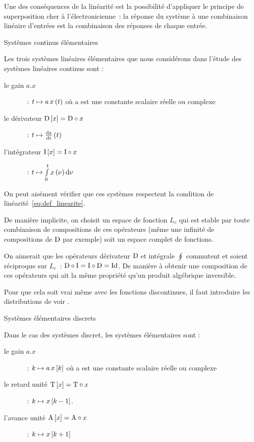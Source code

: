 Une des conséquences de la linéarité est la possibilité d'appliquer le
principe de superposition cher à l'électronicienne~: \og{} la réponse
du système à une combinaison linéaire d'entrées est la combinaison des
réponses de chaque entrée.\fg{}

\begin{definition}{Systèmes continus élémentaires}
  \label{def:systeme_elementaires_continus}
  
  Les trois systèmes linéaires élémentaires que nous considérons dans
  l'étude des systèmes linéaires continus sont :
  \begin{description}
  \item[le gain $a.x$]~: $t \mapsto a\,x\left(t\right)$ où a est une constante
    scalaire réelle ou complexe
  \item[le dérivateur $\mathrm{D}\left[x\right]=\mathrm{D}\circ x$]~:
    $ t \mapsto \frac{\mathrm{d{x}}}{\mathrm{d{t}}}\left(t\right) $
  \item[l'intégrateur $\mathrm{I}\left[x\right]=\mathrm{I}\circ x$]~:
    $ t \mapsto \int\limits_{0}^{t}{x\left(\nu\right)\mathrm{d{\nu}}}$
  \end{description}
\end{definition}

On peut aisément vérifier que ces systèmes respectent la condition de
linéarité~\ref{eq:def_linearite}.

\begin{remarque}
  De manière implicite, on choisit un espace de fonction $L_c$ qui est
  stable par toute combinaison de compositions de ces opérateurs (même
  une infinité de compositions de $\mathrm{D}$ par exemple) soit un espace
  complet de fonctions.

  On aimerait que les opérateurs dérivateur $\mathrm{D}$ et intégrale
  $\oint$ commutent et soient réciproque sur $L_c$~:
  $\mathrm{D}\circ\mathrm{I}=\mathrm{I}\circ\mathrm{D}=\mathrm{Id}$. De manière à obtenir une
  composition de ces opérateurs qui ait la même propriété qu'un
  produit algébrique inversible.
  
  Pour que cela soit vrai même avec les fonctions discontinues, il
  faut introduire les distributions de \Dirac{} voir
  .
\end{remarque}

\begin{definition}{Systèmes élémentaires discrets}
  
  Dans le cas des systèmes discret, les systèmes élémentaires sont :
  \begin{description}
  \item[le gain $a.x$]~: $ k \mapsto a\,x\left[k\right]$ où a est une constante
    scalaire réelle ou complexe
  \item[le retard unité $\mathrm{T}\left[x\right]=\mathrm{T}\circ x$]~:
    $ k \mapsto x\left[k-1\right]$.
  \item[l'avance unité $\mathrm{A}\left[x\right]=\mathrm{A}\circ x$]~:
    $ k \mapsto x\left[k+1\right] $
  \end{description}
\end{definition}

